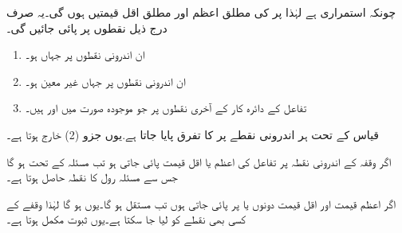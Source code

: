 چونکہ  استمراری ہے لہٰذا  پر  کی مطلق اعظم اور مطلق اقل قیمتیں ہوں گی۔یہ صرف درج ذیل نقطوں پر پائی جائیں گی۔
\begin{enumerate}[1.]
\item
ان اندرونی نقطوں پر جہاں  ہو۔
\item
ان اندرونی نقطوں پر جہاں  غیر معین ہو۔
\item
تفاعل کے دائرہ کار کے  آخری نقطوں پر جو موجودہ صورت میں  اور  ہیں۔
\end{enumerate}
قیاس کے تحت ہر اندرونی نقطے پر  کا تفرق پایا جاتا ہے.یوں جزو (2) خارج ہوتا ہے۔

اگر وقفہ کے اندرونی نقطہ  پر تفاعل کی اعظم یا اقل قیمت پائی جاتی ہو تب مسئلہ  کے تحت  ہو گا جس سے مسئلہ رول کا نقطہ حاصل ہوتا ہے۔

اگر اعظم قیمت اور اقل قیمت دونوں  یا  پر پائی  جاتی ہوں تب  مستقل ہو گا۔یوں  ہو گا لہٰذا وقفے  کے کسی بھی نقطے کو  لیا جا سکتا ہے۔یوں ثبوت مکمل ہوتا ہے۔

